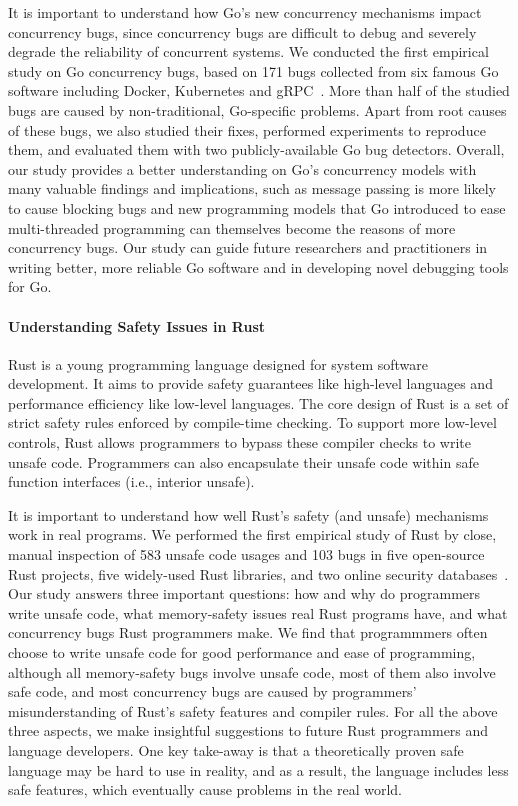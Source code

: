 \documentclass[10pt]{article}
\begin{document}
It is important to understand how Go's new concurrency mechanisms impact concurrency bugs, 
since concurrency bugs are difficult to debug and severely degrade 
the reliability of concurrent systems. 
We conducted the first empirical study on Go concurrency bugs, based on 171 bugs collected from  
six famous Go software 
including Docker, Kubernetes and gRPC~\cite{go-asplos}.
More than half of the studied bugs are caused by non-traditional, Go-specific problems. 
Apart from root causes of these bugs, we also studied their fixes, 
performed experiments to reproduce them, 
and evaluated them with two publicly-available Go bug detectors.
Overall, our study provides a better understanding on Go's concurrency models
with many valuable findings and implications, such as message passing is more likely to 
cause blocking bugs and new programming models
that Go introduced to ease multi-threaded programming can themselves 
become the reasons of more concurrency bugs. 
Our study can guide future researchers and practitioners in writing better, 
more reliable Go software and in developing novel debugging tools for Go.

\vspace{-.1in}
\paragraph{Understanding Safety Issues in Rust}
Rust is a young programming language designed for system software development. 
It aims to provide safety guarantees like high-level languages 
and performance efficiency
like low-level languages. The core design of Rust is a set
of strict safety rules enforced by compile-time checking. To
support more low-level controls, Rust allows programmers
to bypass these compiler checks to write unsafe code. 
Programmers can also encapsulate their unsafe code within safe
function interfaces (i.e., interior unsafe).

It is important to understand how well Rust’s safety (and
unsafe) mechanisms work in real programs. We performed
the first empirical study of Rust by close, manual inspection of 583 unsafe code usages 
and 103 bugs in five open-source Rust projects, five widely-used Rust libraries, and two
online security databases~\cite{sosp-boqin,yu2019fearless}. Our study answers three important 
questions: how and why do programmers write unsafe
code, what memory-safety issues real Rust programs have,
and what concurrency bugs Rust programmers make. 
We find that programmmers often choose to write unsafe code for good performance 
and ease of programming, although all memory-safety bugs involve unsafe code, 
most of them also involve safe code, and 
most concurrency bugs are caused by programmers' misunderstanding of Rust's safety features 
and compiler rules. 
For all the above three aspects, we make insightful suggestions 
to future Rust programmers and language developers. 
One key take-away is that a theoretically proven safe language may be hard to 
use in reality, and as a result, the language includes less safe features, which eventually cause
problems in the real world.
\end{document}
